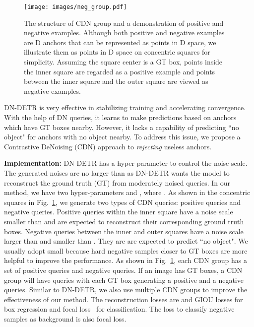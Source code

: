 \documentclass[runningheads]{llncs}
\begin{document}
\begin{figure}[h]
\texttt{[image: images/neg\_group.pdf]}
    \centering
    \vspace{-0.3cm}
    \caption{The structure of CDN group and a demonstration of positive and negative examples.
Although both positive and negative examples are D anchors that can be represented as points in D space, we illustrate them as points in D space on concentric squares for simplicity. Assuming the square center is a GT box, points inside the inner square are regarded as a positive example and points between the inner square and the outer square are viewed as negative examples.
    }
    \label{fig:CDN}
\end{figure} DN-DETR is very effective in stabilizing training and accelerating convergence. With the help of DN queries, it learns to make predictions based on anchors which have GT boxes nearby. However, it lacks a capability of predicting ``no object" for anchors with no object nearby. To address this issue, we propose a Contrastive DeNoising (CDN) approach to \emph{rejecting} useless anchors. 

\noindent\textbf{Implementation:} DN-DETR has a hyper-parameter  to control the noise scale. The generated noises are no larger than  as DN-DETR wants the model to reconstruct the ground truth (GT) from moderately noised queries. In our method, we have two hyper-parameters  and , where . As shown in the concentric squares in Fig.~\ref{fig:CDN}, we generate two types of CDN queries: positive queries and negative queries. Positive queries within the inner square have a noise scale smaller than  and are expected to reconstruct their corresponding ground truth boxes. Negative queries between the inner and outer squares have a noise scale larger than  and smaller than . They are are expected to predict ``no object". We usually adopt small  because hard negative samples closer to GT boxes are more helpful to improve the performance. As shown in Fig.~\ref{fig:CDN}, each CDN group has a set of positive queries and negative queries. If an image has  GT boxes, a CDN group will have  queries with each GT box generating a positive and a negative queries. Similar to DN-DETR, we also use multiple CDN groups to improve the effectiveness of our method. The reconstruction losses are  and GIOU losses for 
box regression and focal loss~\cite{lin2018focal} for classification. The loss to classify negative samples as background is also focal loss.
\end{document}
